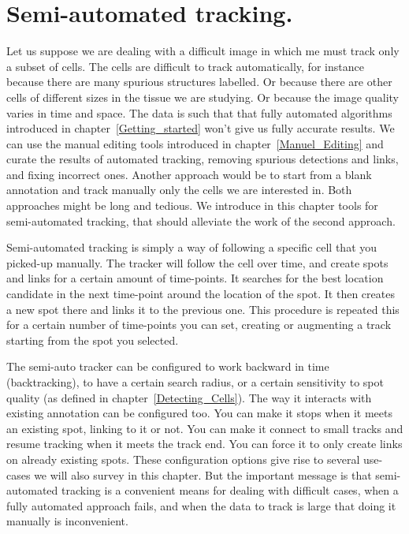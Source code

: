 \section{Semi-automated tracking.}

Let us suppose we are dealing with a difficult image in which me must track only a subset of cells. 
The cells are difficult to track automatically, for instance because there are many spurious structures labelled. 
Or because there are other cells of different sizes in the tissue we are studying. 
Or because the image quality varies in time and space. 
The data is such that that fully automated algorithms introduced in chapter~\ref{Getting_started} won't give us fully accurate results. 
We can use the manual editing tools introduced in chapter~\ref{Manuel_Editing} and curate the results of automated tracking, removing spurious detections and links, and fixing incorrect ones. 
Another approach would be to start from a blank annotation and track manually only the cells we are interested in. 
Both approaches might be long and tedious. 
We introduce in this chapter tools for semi-automated tracking, that should alleviate the work of the second approach.

Semi-automated tracking is simply a way of following a specific cell that you picked-up manually. 
The tracker will follow the cell over time, and create spots and links for a certain amount of time-points.
It searches for the best location candidate in the next time-point around the location of the spot.
It then creates a new spot there and links it to the previous one.
This procedure is repeated this for a certain number of time-points you can set, creating or augmenting a track starting from the spot you selected.

The semi-auto tracker can be configured to work backward in time (backtracking), to have a certain search radius, or a certain sensitivity to spot quality (as defined in chapter~\ref{Detecting_Cells}).
The way it interacts with existing annotation can be configured too. 
You can make it stops when it meets an existing spot, linking to it or not.
You can make it connect to small tracks and resume tracking when it meets the track end.
You can force it to only create links on already existing spots. 
These configuration options give rise to several use-cases we will also survey in this chapter.
But the important message is that semi-automated tracking is a convenient means for dealing with difficult cases, when a fully automated approach fails, and when the data to track is large that doing it manually is inconvenient.

